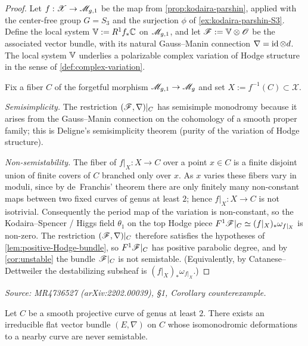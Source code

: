 \begin{proof}
  Let \(f : \mathscr{X} \to \mathscr{M}_{g,1}\) be the map from
  \cref{prop:kodaira-parshin}, applied with the center-free group \(G = S_3\) and
  the surjection \(\phi\) of \cref{ex:kodaira-parshin-S3}. Define the local
  system \(\mathbb{V} := R^1 f_* \mathbb{C}\) on \(\mathscr{M}_{g,1}\), and let \(\mathscr{F} := \mathbb{V} \otimes \mathscr{O}\)
  be the associated vector bundle, with its natural Gauss--Manin connection
  \(\nabla = \operatorname{id} \otimes d\). The local system \(\mathbb{V}\) underlies a polarizable
  complex variation of Hodge structure in the sense of
  \cref{def:complex-variation}.

  Fix a fiber \(C\) of the forgetful morphism \(\mathscr{M}_{g,1} \to \mathscr{M}_g\) and set
  \(X := f^{-1}(C) \subset \mathscr{X}\).

  \emph{Semisimplicity.} The restriction \((\mathscr{F}, \nabla)|_C\) has semisimple
  monodromy because it arises from the Gauss--Manin connection on the cohomology
  of a smooth proper family; this is Deligne's semisimplicity theorem (purity of
  the variation of Hodge structure).

  \emph{Non-semistability.} The fiber of \(f|_X : X \to C\) over a point
  \(x \in C\) is a finite disjoint union of finite covers of \(C\) branched only
  over \(x\). As \(x\) varies these fibers vary in moduli, since by de~Franchis'
  theorem there are only finitely many non-constant maps between two fixed curves
  of genus at least \(2\); hence \(f|_X : X \to C\) is not isotrivial.
  Consequently the period map of the variation is non-constant, so the
  Kodaira--Spencer / Higgs field \(\theta_1\) on the top Hodge piece
  \(F^1 \mathscr{F}|_C \simeq (f|_X)_* \omega_{f|_X}\) is non-zero. The restriction
  \((\mathscr{F}, \nabla)|_C\) therefore satisfies the hypotheses of
  \cref{lem:positive-Hodge-bundle}, so \(F^1 \mathscr{F}|_C\) has positive parabolic
  degree, and by \cref{cor:unstable} the bundle \(\mathscr{F}|_C\) is not semistable.
  (Equivalently, by Catanese--Dettweiler the destabilizing subsheaf is
  \((f|_X)_* \omega_{f|_X}\).)
\end{proof}

\begin{corollary}
  \label{cor:counterexample}
  \textit{Source: MR4736527 (arXiv:2202.00039), §1, Corollary counterexample.}

  Let \(C\) be a smooth projective curve of genus at least \(2\). There exists an
  irreducible flat vector bundle \((E, \nabla)\) on \(C\) whose isomonodromic
  deformations to a nearby curve are never semistable.
\end{corollary}

